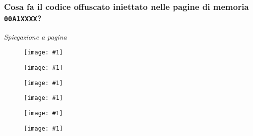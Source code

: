 \documentclass[
    a4paper, %
    11pt %
]{article}
\newcommand{\pic}[4]{\begin{figure}[H]
            \centering
            \texttt{[image: \#1]}
            \caption{#2}
            \label{fig:#1}
            \end{figure}}
\begin{document}
            \subsubsection{Cosa fa il codice offuscato iniettato nelle pagine di memoria \texttt{00A1XXXX}?}
            
            \textit{Spiegazione a pagina \pageref{page:malware_deployer_explaination}}

            \pic{explorer_comparison_exec_inj}{}{19cm}{21cm}
            \pic{explorer_comparison_exec_orig}{}{19cm}{21cm}

            \pic{explorer_comparison_mem0_inj}{}{19cm}{23cm}
            \pic{explorer_comparison_mem0_orig}{}{19cm}{23cm}

            \pic{explorer_comparison_mem1_inj}{}{19cm}{23cm}
            \pic{explorer_comparison_mem1_orig}{}{19cm}{23cm}
            
            \pagebreak

            \label{page:malware_deployer_explaination}
            
\end{document}
